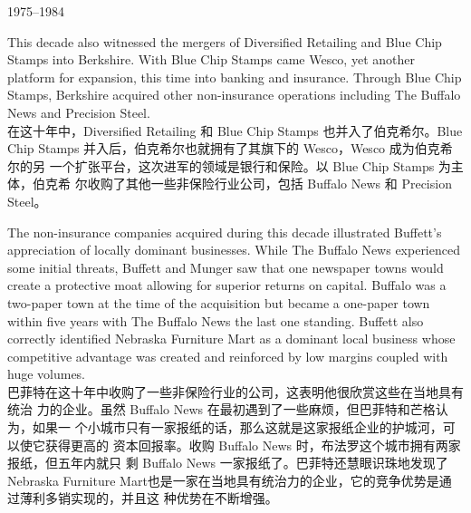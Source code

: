 \begin{section}{1975--1984}
\begin{verseparallel}
  {
    This decade also witnessed the mergers of Diversified Retailing and Blue
    Chip Stamps into Berkshire. With Blue Chip Stamps came Wesco, yet another
    platform for expansion, this time into banking and insurance. Through Blue
    Chip Stamps, Berkshire acquired other non-insurance operations including The
    Buffalo News and Precision Steel. \\
  }
  {
    在这十年中，Diversified Retailing 和 Blue Chip Stamps 也并入了伯克希尔。Blue
    Chip Stamps 并入后，伯克希尔也就拥有了其旗下的 Wesco，Wesco 成为伯克希尔的另
    一个扩张平台，这次进军的领域是银行和保险。以 Blue Chip Stamps 为主体，伯克希
    尔收购了其他一些非保险行业公司，包括 Buffalo News 和 Precision Steel。
  }
\end{verseparallel}

\begin{verseparallel}
  {
    The non-insurance companies acquired during this decade illustrated
    Buffett's appreciation of locally dominant businesses. While The Buffalo
    News experienced some initial threats, Buffett and Munger saw that one
    newspaper towns would create a protective moat allowing for superior returns
    on capital. Buffalo was a two-paper town at the time of the acquisition but
    became a one-paper town within five years with The Buffalo News the last one
    standing. Buffett also correctly identified Nebraska Furniture Mart as a
    dominant local business whose competitive advantage was created and
    reinforced by low margins coupled with huge volumes. \\
  }
  {
    巴菲特在这十年中收购了一些非保险行业的公司，这表明他很欣赏这些在当地具有统治
    力的企业。虽然 Buffalo News 在最初遇到了一些麻烦，但巴菲特和芒格认为，如果一
    个小城市只有一家报纸的话，那么这就是这家报纸企业的护城河，可以使它获得更高的
    资本回报率。收购 Buffalo News 时，布法罗这个城市拥有两家报纸，但五年内就只
    剩 Buffalo News 一家报纸了。巴菲特还慧眼识珠地发现了 Nebraska Furniture
    Mart也是一家在当地具有统治力的企业，它的竞争优势是通过薄利多销实现的，并且这
    种优势在不断增强。
  }
\end{verseparallel}


\end{section}
